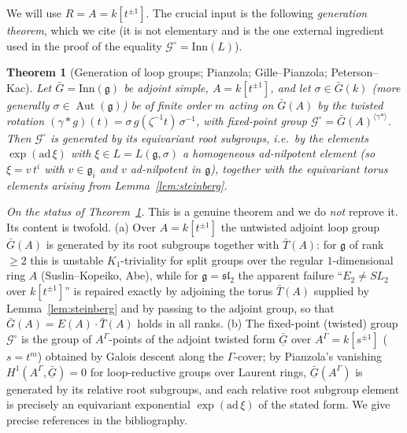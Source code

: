 \documentclass{amsart}
\newtheorem{theorem}{Theorem}
\theoremstyle{definition}
\DeclareMathOperator{\Aut}{Aut}
\newcommand{\g}{\mathfrak{g}}
\begin{document}
We will use $R=A=k[t^{\pm1}]$.  The crucial input is the following
\emph{generation theorem}, which we cite (it is not elementary and is the one
external ingredient used in the proof of the equality $\mathcal G^\circ=\mathrm{Inn}(L)$).

\begin{theorem}[Generation of loop groups; {Pianzola; Gille--Pianzola; Peterson--Kac}]
\label{thm:looptorgen}
Let $\bar G=\mathrm{Inn}(\g)$ be adjoint simple, $A=k[t^{\pm1}]$, and let
$\sigma\in\bar G(k)$ (more generally $\sigma\in\Aut(\g)$) be of finite order
$m$ acting on $\bar G(A)$ by the twisted rotation
$(\gamma * g)(t)=\sigma\,g(\zeta^{-1}t)\,\sigma^{-1}$, with fixed-point group
$\mathcal G^\circ=\bar G(A)^{\langle\gamma*\rangle}$.  Then $\mathcal
G^\circ$ is generated by its equivariant root subgroups, i.e.\ by the
elements $\exp(\mathrm{ad}\,\xi)$ with $\xi\in L=L(\g,\sigma)$ a homogeneous
\textnormal{ad}-nilpotent element (so $\xi=v\,t^i$ with $v\in\g_{\bar i}$ and
$v$ \textnormal{ad}-nilpotent in $\g$), together with the equivariant torus
elements arising from \textnormal{Lemma~\ref{lem:steinberg}}.
\end{theorem}

\noindent\emph{On the status of Theorem~\ref{thm:looptorgen}.}  This is a
genuine theorem and we do \emph{not} reprove it.  Its content is twofold.
(a) Over $A=k[t^{\pm1}]$ the untwisted adjoint loop group $\bar G(A)$ is
generated by its root subgroups together with $\bar T(A)$: for $\g$ of rank
$\ge2$ this is unstable $K_1$-triviality for split groups over the regular
$1$-dimensional ring $A$ (Suslin--Kopeiko, Abe), while for $\g=\mathfrak{sl}_2$
the apparent failure ``$E_2\ne SL_2$ over $k[t^{\pm1}]$'' is repaired exactly
by adjoining the torus $\bar T(A)$ supplied by Lemma~\ref{lem:steinberg} and
by passing to the adjoint group, so that $\bar G(A)=E(A)\cdot\bar T(A)$ holds
in all ranks.  (b) The fixed-point (twisted) group $\mathcal G^\circ$ is the
group of $A^\Gamma$-points of the adjoint twisted form $\underline{\bar G}$
over $A^\Gamma=k[s^{\pm1}]$ ($s=t^m$) obtained by Galois descent along the
$\Gamma$-cover; by Pianzola's vanishing $H^1(A^\Gamma,\underline{\bar G})=0$
for loop-reductive groups over Laurent rings, $\underline{\bar G}(A^\Gamma)$
is generated by its relative root subgroups, and each relative root subgroup
element is precisely an equivariant exponential $\exp(\mathrm{ad}\,\xi)$ of
the stated form.  We give precise references in the bibliography.
\end{document}
